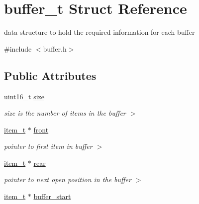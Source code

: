 \hypertarget{structbuffer__t}{\section{buffer\+\_\+t Struct Reference}
\label{structbuffer__t}
}


data structure to hold the required information for each buffer  




{\ttfamily \#include $<$buffer.\+h$>$}

\subsection*{Public Attributes}
\begin{DoxyCompactItemize}
\item 
\hypertarget{structbuffer__t_a71b3f12052a171249ae6ad4e08e93ec4}{uint16\+\_\+t \hyperlink{structbuffer__t_a71b3f12052a171249ae6ad4e08e93ec4}{size}}\label{structbuffer__t_a71b3f12052a171249ae6ad4e08e93ec4}

\begin{DoxyCompactList}\small\item\em size is the number of items in the buffer $>$ \end{DoxyCompactList}\item 
\hypertarget{structbuffer__t_ae47416a47e4ded004e3817f34c0a5ae8}{\hyperlink{group__buffer_gad9732dcc12e8aa91d552188c72dea329}{item\+\_\+t} $\ast$ \hyperlink{structbuffer__t_ae47416a47e4ded004e3817f34c0a5ae8}{front}}\label{structbuffer__t_ae47416a47e4ded004e3817f34c0a5ae8}

\begin{DoxyCompactList}\small\item\em pointer to first item in buffer $>$ \end{DoxyCompactList}\item 
\hypertarget{structbuffer__t_ade37b7160f51ce6ef2797e4fb848f70a}{\hyperlink{group__buffer_gad9732dcc12e8aa91d552188c72dea329}{item\+\_\+t} $\ast$ \hyperlink{structbuffer__t_ade37b7160f51ce6ef2797e4fb848f70a}{rear}}\label{structbuffer__t_ade37b7160f51ce6ef2797e4fb848f70a}

\begin{DoxyCompactList}\small\item\em pointer to next open position in the buffer $>$ \end{DoxyCompactList}\item 
\hypertarget{structbuffer__t_a582cf6beedacf00ed5118ca38bcf9e5e}{\hyperlink{group__buffer_gad9732dcc12e8aa91d552188c72dea329}{item\+\_\+t} $\ast$ \hyperlink{structbuffer__t_a582cf6beedacf00ed5118ca38bcf9e5e}{buffer\+\_\+start}}\label{structbuffer__t_a582cf6beedacf00ed5118ca38bcf9e5e}


\end{DoxyCompactItemize}

